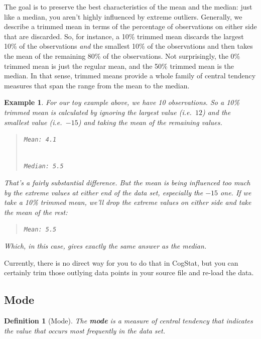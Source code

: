 \documentclass[
  11pt,
]{book}
\theoremstyle{indenteddefinition}
\newtheorem{definition}{Definition}[chapter]
\theoremstyle{indenteddefinition}
\newtheorem{example}{Example}[chapter]
\theoremstyle{definition}
\theoremstyle{definition}
\theoremstyle{remark}
\begin{document}
The goal is to preserve the best characteristics of the mean and the median: just like a median, you aren't highly influenced by extreme outliers. Generally, we describe a trimmed mean in terms of the percentage of observations on either side that are discarded. So, for instance, a 10\% trimmed mean discards the largest 10\% of the observations \emph{and} the smallest 10\% of the observations and then takes the mean of the remaining 80\% of the observations. Not surprisingly, the 0\% trimmed mean is just the regular mean, and the 50\% trimmed mean is the median. In that sense, trimmed means provide a whole family of central tendency measures that span the range from the mean to the median.

\begin{example}
\protect\hypertarget{exm:extrimmedmean}{}\label{exm:extrimmedmean}For our toy example above, we have 10 observations. So a 10\% trimmed mean is calculated by ignoring the largest value (i.e.~\(12\)) and the smallest value (i.e.~\(-15\)) and taking the mean of the remaining values.

\begin{quote}
\texttt{Mean:\ 4.1}\strut \\
\texttt{Median:\ 5.5}
\end{quote}

That's a fairly substantial difference. But the mean is being influenced too much by the extreme values at either end of the data set, especially the \(-15\) one. If we take a 10\% trimmed mean, we'll drop the extreme values on either side and take the mean of the rest:

\begin{quote}
\texttt{Mean:\ 5.5}
\end{quote}

Which, in this case, gives exactly the same answer as the median.
\end{example}

Currently, there is no direct way for you to do that in CogStat, but you can certainly trim those outlying data points in your source file and re-load the data.

\hypertarget{mode}{%
\subsection{Mode}\label{mode}}

\begin{definition}[Mode]
\protect\hypertarget{def:defmode}{}\label{def:defmode}The \textbf{mode} is a measure of central tendency that indicates the value that occurs most frequently in the data set.
\end{definition}
\end{document}
